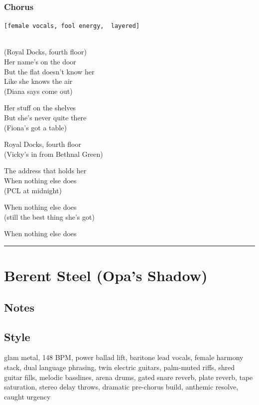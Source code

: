 \documentclass[]{article}
\begin{document}
\subsubsection{Chorus}\label{chorus-85}

\texttt{{[}female\ vocals,\ fool\ energy,\ \ layered{]}}\strut \\
(Royal Docks, fourth floor)\\
Her name's on the door\\
But the flat doesn't know her\\
Like she knows the air\\
(Diana says come out)

Her stuff on the shelves\\
But she's never quite there\\
(Fiona's got a table)

Royal Docks, fourth floor\\
(Vicky's in from Bethnal Green)

The address that holds her\\
When nothing else does\\
(PCL at midnight)

When nothing else does\\
(still the best thing she's got)

When nothing else does

\begin{center}\rule{0.5\linewidth}{0.5pt}\end{center}

\section{Berent Steel (Opa's Shadow)}\label{berent-steel-opas-shadow}

\subsection{Notes}\label{notes-48}

\subsection{Style}\label{style-48}

glam metal, 148 BPM, power ballad lift, baritone lead vocals, female
harmony stack, dual language phrasing, twin electric guitars, palm-muted
riffs, shred guitar fills, melodic basslines, arena drums, gated snare
reverb, plate reverb, tape saturation, stereo delay throws, dramatic
pre-chorus build, anthemic resolve, caught urgency
\end{document}
